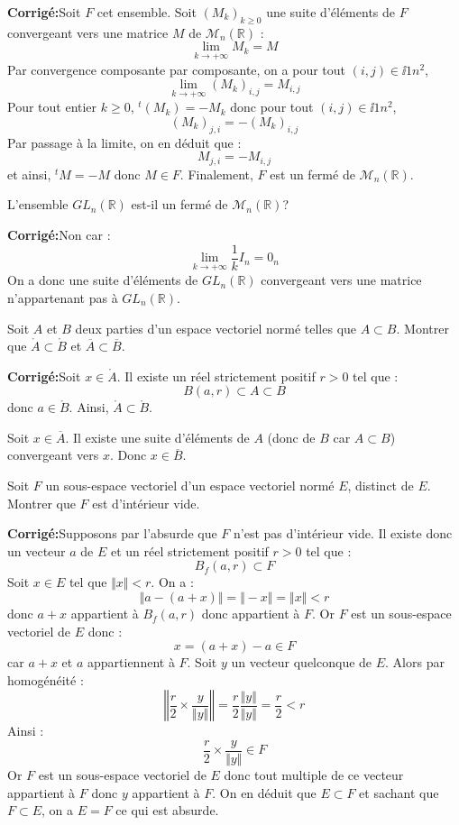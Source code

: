 \documentclass[a4paper,twoside,french,11pt]{VcCours}
\newcommand{\corr}{\textbf{Corrigé:}}
\begin{document}
\corr Soit $F$ cet ensemble. Soit $(M_k)_{k \geq 0}$ une suite d'éléments de $F$ convergeant vers une matrice $M$ de $\mathcal{M}_n(\mathbb{R})$ :
$$ \lim_{k \rightarrow + \infty} M_k = M$$
Par convergence composante par composante, on a pour tout $(i,j) \in \ii{1}{n}^2$,
$$  \lim_{k \rightarrow + \infty} (M_k)_{i,j} = M_{i,j}$$
Pour tout entier $k \geq 0$, $^t(M_k)=-M_k$ donc pour tout $(i,j) \in \ii{1}{n}^2$,
$$ (M_k)_{j,i} = - (M_k)_{i,j}$$
Par passage à la limite, on en déduit que :
$$ M_{j,i}=-M_{i,j}$$
et ainsi, $^t M=-M$ donc $M \in F$. Finalement, $F$ est un fermé de $\mathcal{M}_n(\mathbb{R})$.

\begin{Exercice}{} L'ensemble $GL_n(\mathbb{R})$ est-il un fermé de $\mathcal{M}_n(\mathbb{R})$?
\end{Exercice} 

\corr Non car :
$$ \lim_{k \rightarrow + \infty} \dfrac{1}{k} I_n = 0_n$$
On a donc une suite d'éléments de $GL_n(\mathbb{R})$ convergeant vers une matrice n'appartenant pas à $GL_n(\mathbb{R})$.


\begin{Exercice}{} Soit $A$ et $B$ deux parties d'un espace vectoriel normé telles que $A \subset B$. Montrer que $\mathring{A} \subset \mathring{B}$ et $\overline{A} \subset \overline{B}$.
\end{Exercice}

\corr Soit $x \in \mathring{A}$. Il existe un réel strictement positif $r>0$ tel que :
$$ B(a,r) \subset A \subset B$$
donc $a \in  \mathring{B}$. Ainsi, $\mathring{A} \subset \mathring{B}$.


Soit $x \in \overline{A}$. Il existe une suite d'éléments de $A$ (donc de $B$ car $A \subset B$) convergeant vers $x$. Donc $x \in \overline{B}$.


\begin{Exercice}[$\bigstar$]{} Soit $F$ un sous-espace vectoriel d'un espace vectoriel normé $E$, distinct de $E$. Montrer que $F$ est d'intérieur vide.
\end{Exercice}

\corr Supposons par l'absurde que $F$ n'est pas d'intérieur vide. Il existe donc un vecteur $a$ de $E$ et un réel strictement positif $r>0$ tel que :
$$ B_f(a,r) \subset F$$
Soit $x \in E$ tel que $\Vert x \Vert <r$. On a :
$$ \Vert a-(a+x) \Vert =  \Vert -x \Vert = \Vert x \Vert < r$$
donc $a+x$ appartient à $B_f(a,r)$ donc appartient à $F$. Or $F$ est un sous-espace vectoriel de $E$ donc :
$$ x = (a+x) -a \in F$$
car $a+x$ et $a$ appartiennent à $F$. Soit $y$ un vecteur quelconque de $E$. Alors par homogénéité :
$$ \left\Vert \dfrac{r}{2} \times \dfrac{y}{\Vert y \Vert } \right\Vert  = \dfrac{r}{2} \dfrac{\Vert y \Vert }{\Vert y \Vert } = \dfrac{r}{2} < r$$
Ainsi :
$$ \dfrac{r}{2} \times \dfrac{y}{\Vert y \Vert } \in F$$
Or $F$ est un sous-espace vectoriel de $E$ donc tout multiple de ce vecteur appartient à $F$ donc $y$ appartient à $F$. On en déduit que $E \subset F$ et sachant que $F \subset E$, on a $E=F$ ce qui est absurde.
\end{document}
